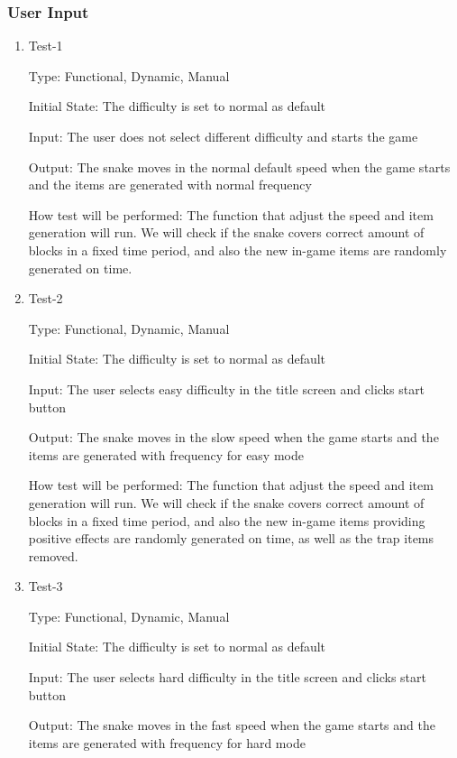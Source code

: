 \documentclass[12pt, titlepage]{article}
\begin{document}
\subsubsection{User Input}

\begin{enumerate}

\item{Test-1\\}

Type: Functional, Dynamic, Manual

Initial State: The difficulty is set to normal as default

Input: The user does not select different difficulty and starts the game

Output: The snake moves in the normal default speed when the game starts and the items are generated with normal frequency

How test will be performed: The function that adjust the speed and item generation will run. We will check if the snake covers correct amount of blocks in a fixed time period, and also the new in-game items are randomly generated on time.

\item{Test-2\\}

Type: Functional, Dynamic, Manual

Initial State: The difficulty is set to normal as default

Input: The user selects easy difficulty in the title screen and clicks start button

Output: The snake moves in the slow speed when the game starts and the items are generated with  frequency for easy mode

How test will be performed: The function that adjust the speed and item generation will run. We will check if the snake covers correct amount of blocks in a fixed time period, and also the new in-game items providing positive effects are randomly generated on time, as well as the trap items removed.

\item{Test-3\\}

Type: Functional, Dynamic, Manual

Initial State: The difficulty is set to normal as default

Input: The user selects hard difficulty in the title screen and clicks start button

Output: The snake moves in the fast speed when the game starts and the items are generated with  frequency for hard mode


\end{enumerate}
\end{document}

